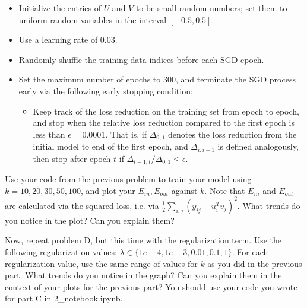 \begin{itemize}
\item Initialize the entries of $U$ and $V$ to be small random numbers; set them to uniform random variables in the interval $[-0.5, 0.5]$.
\item Use a learning rate of 0.03.
\item Randomly shuffle the training data indices before each SGD epoch.
\item Set the maximum number of epochs to 300, and terminate the SGD process early via the following early stopping condition:
\begin{itemize}
\item Keep track of the loss reduction on the training set from epoch to epoch, and stop when the relative loss reduction compared to the first epoch is less than $\epsilon = 0.0001$.  That is, if $\Delta_{0,1}$ denotes the loss reduction from the initial model to end of the first epoch, and $\Delta_{i, i-1}$ is defined analogously, then stop after epoch $t$ if $\Delta_{t-1,t} / \Delta_{0,1} \leq \epsilon$.
\end{itemize}
\end{itemize}
\begin{solution}

\end{solution}

\problem[5]Use your code from the previous problem to train your model using $k=10, 20, 30, 50, 100$, and plot your $E_{in}, E_{out}$ against $k$. Note that $E_{in}$ and $E_{out}$ are calculated via the squared loss, i.e. via $\frac{1}{2}\sum_{i,j} \left( y_{ij} - u_i^Tv_j\right)^2$. What trends do you notice in the plot? Can you explain them?

\begin{solution}
\end{solution}

\problem[5]Now, repeat problem D, but this time with the regularization term. Use the following regularization values: $\lambda \in \{1e-4, 1e-3, 0.01, 0.1, 1\}$. For each regularization value, use the same range of values for $k$ as you did in the previous part. What trends do you notice in the graph? Can you explain them in the context of your plots for the previous part? You should use your code you wrote for part C in 2_notebook.ipynb.

\begin{solution}

\end{solution}

